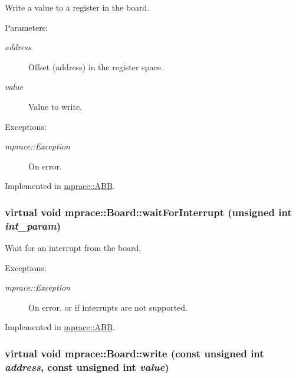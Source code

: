 Write a value to a register in the board. 

\begin{Desc}
\item[Parameters:]
\begin{description}
\item[{\em address}]Offset (address) in the register space. \item[{\em value}]Value to write. \end{description}
\end{Desc}
\begin{Desc}
\item[Exceptions:]
\begin{description}
\item[{\em mprace::Exception}]On error.\end{description}
\end{Desc}


Implemented in \hyperlink{classmprace_1_1ABB_a2}{mprace::ABB}.\hypertarget{classmprace_1_1Board_a16}{
\subsubsection[waitForInterrupt]{\setlength{\rightskip}{0pt plus 5cm}virtual void mprace::Board::wait\-For\-Interrupt (unsigned int {\em int\_\-param})}}
\label{classmprace_1_1Board_a16}


Wait for an interrupt from the board. 

\begin{Desc}
\item[Exceptions:]
\begin{description}
\item[{\em mprace::Exception}]On error, or if interrupts are not supported.\end{description}
\end{Desc}


Implemented in \hyperlink{classmprace_1_1ABB_a15}{mprace::ABB}.\hypertarget{classmprace_1_1Board_a3}{
\subsubsection[write]{\setlength{\rightskip}{0pt plus 5cm}virtual void mprace::Board::write (const unsigned int {\em address}, const unsigned int {\em value})}}
\label{classmprace_1_1Board_a3}


